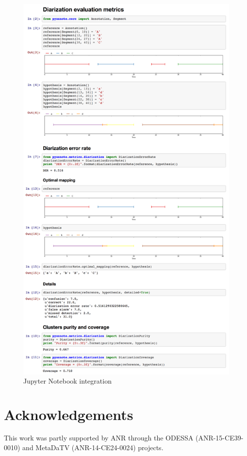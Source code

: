\documentclass[a4paper]{article}
\begin{document}
\begin{figure}[htb]
  \centering
  \includegraphics[width=\linewidth]{figures/notebook.png}
  \caption{Jupyter Notebook integration}
  \label{fig:notebook}
\end{figure}

\section{Acknowledgements}

This work was partly supported by ANR through
the ODESSA (ANR-15-CE39-0010) and MetaDaTV (ANR-14-CE24-0024) projects.

\newpage
\balance


\end{document}
